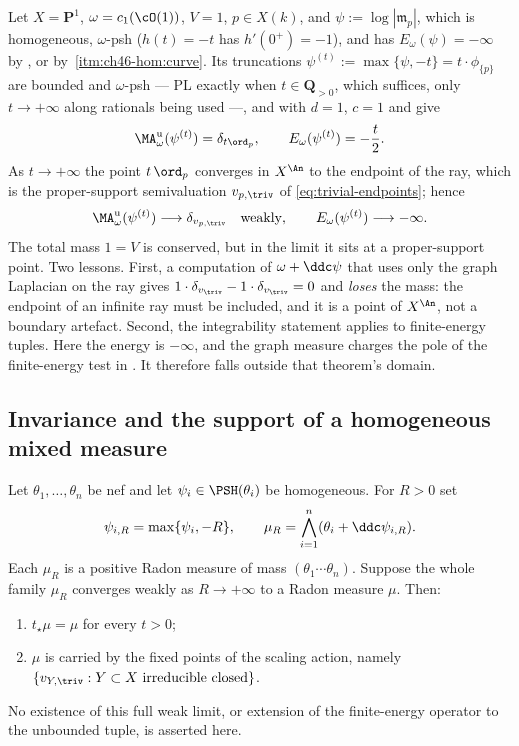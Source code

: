 \begin{example}
\label{ex:ch46-homogeneous-mass-escapes}
Let $X=\mathbf P^1$, $\omega=c_1(\cO(1))$, $V=1$, $p\in X(k)$, and
$\psi:=\log|\mathfrak m_p|$, which is homogeneous, $\omega$-psh
($h(t)=-t$ has $h'(0^+)=-1$), and has $E_\omega(\psi)=-\infty$ by
, or by
\,\cref{itm:ch46-hom:curve}.  Its truncations
$\psi^{(t)}:=\max\{\psi,-t\}=t\cdot\phi_{\{p\}}$ are bounded and
$\omega$-psh --- PL exactly when $t\in\mathbf Q_{>0}$, which suffices,
only $t\to+\infty$ along rationals being used ---, and  with $d=1$, $c=1$ and
 give
\[
 \MA^{\mathrm u}_\omega(\psi^{(t)})=\delta_{t\ord_p},
 \qquad
 E_\omega(\psi^{(t)})=-\frac t2 .
\]
As $t\to+\infty$ the point $t\,\ord_p$ converges in $X^{\An}$ to the
endpoint of the ray, which is the proper-support semivaluation
$v_{p,\triv}$ of \eqref{eq:trivial-endpoints}; hence
\[
 \MA^{\mathrm u}_\omega(\psi^{(t)})\longrightarrow\delta_{v_{p,\triv}}
 \quad\text{weakly},
 \qquad
 E_\omega(\psi^{(t)})\longrightarrow-\infty .
\]
The total mass $1=V$ is conserved, but in the limit it sits at a
proper-support point.  Two lessons.  First, a computation of
$\omega+\ddc\psi$ that uses only the graph Laplacian on the ray gives
$1\cdot\delta_{v_{\triv}}-1\cdot\delta_{v_{\triv}}=0$ and \emph{loses}
the mass: the endpoint of an infinite ray must be included, and it is a
point of $X^{\An}$, not a boundary artefact.  Second, the integrability statement
 applies to finite-energy tuples.
Here the energy is $-\infty$, and the graph measure charges the pole of
the finite-energy test in . It therefore falls
outside that theorem's domain.
\end{example}

\subsection{Invariance and the support of a homogeneous mixed measure}
\label{sec:ch46-homogeneous-support}

\begin{proposition}
\label{prop:ch46-homogeneous-support}
Let $\theta_1,\ldots,\theta_n$ be nef and let
$\psi_i\in\PSH(\theta_i)$ be homogeneous. For $R>0$ set
\[
 \psi_{i,R}=\max\{\psi_i,-R\},\qquad
 \mu_R=\bigwedge_{i=1}^n(\theta_i+\ddc\psi_{i,R}).
\]
Each $\mu_R$ is a positive Radon measure of mass
$(\theta_1\cdots\theta_n)$. Suppose the whole family $\mu_R$ converges
weakly as $R\to+\infty$ to a Radon measure $\mu$. Then:
\begin{enumerate}
\item\label{itm:ch46-homsupp:inv}
      $t_\star\mu=\mu$ for every $t>0$;
\item\label{itm:ch46-homsupp:supp}
      $\mu$ is carried by the fixed points of the scaling action,
      namely $\{v_{Y,\triv}:Y\subset X\text{ irreducible closed}\}$.
\end{enumerate}
No existence of this full weak limit, or extension of the finite-energy
operator to the unbounded tuple, is asserted here.
\end{proposition}

